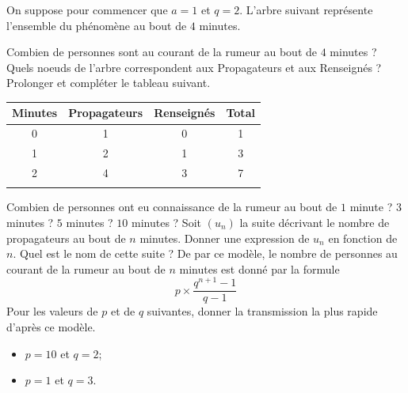 \documentclass{exam}
\begin{document}
\begin{questions}
\question On suppose pour commencer que $a = 1$ et $q = 2$. L'arbre suivant représente l'ensemble du phénomène au bout de $4$ minutes.
\begin{center}
\end{center}
Combien de personnes sont au courant de la rumeur au bout de $4$ minutes ? Quels noeuds de l'arbre correspondent aux Propagateurs et aux Renseignés ?
\makeemptybox{2cm}
\question Prolonger et compléter le tableau suivant.
\begin{center}
\begin{tabular}{|c|c|c|c|}
\hline
Minutes & Propagateurs & Renseignés & Total\\
\hline
0 & 1 & 0 & 1\\
\hline
1 & 2 & 1 & 3\\
\hline
2 & 4 & 3 & 7\\
\hline
&  &  & \\
\hline
\end{tabular}
\end{center}
\makeemptybox{2cm}
\question Combien de personnes ont eu connaissance de la rumeur au bout de $1$ minute ? $3$ minutes ? $5$ minutes ? $10$ minutes ?
\makeemptybox{2cm}
\question Soit $(u_n)$ la suite décrivant le nombre de propagateurs au bout de $n$ minutes. Donner une expression de $u_n$ en fonction de $n$. Quel est le nom de cette suite ?
\makeemptybox{2cm}
\question De par ce modèle, le nombre de personnes au courant de la rumeur au bout de $n$ minutes est donné par la formule
\begin{equation*}
p \times \dfrac{q^{n+1} - 1}{q - 1}
\end{equation*}
Pour les valeurs de $p$ et de $q$ suivantes, donner la transmission la plus rapide d'après ce modèle.
\begin{itemize}
\item $p=10$ et $q=2$;
\item $p=1$ et $q=3$. 
\end{itemize}
\makeemptybox{4cm}
\newpage

\end{questions}
\end{document}
